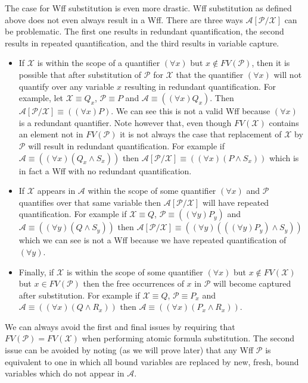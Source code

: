 \documentclass[12pt]{article}
\theoremstyle{break}
\theoremstyle{break}
\theoremstyle{break}
\theoremstyle{break}
\newcommand{\mc}[1]{\mathcal{#1}}
\begin{document}
The case for Wff substitution is even more drastic.
Wff substitution as defined above does not even always result in a Wff.
There are three ways $\mc{A}[\mc{P}/\mc{X}]$ can be problematic.
The first one results in redundant quantification, the second results in repeated quantification, and the third results in variable capture.

\begin{itemize}
\item{If $\mc{X}$ is within the scope of a quantifier $(\forall x)$ but $x\not \in FV(\mc{P})$, then it is possible that after substitution of $\mc{P}$ for $\mc{X}$ that the quantifier $(\forall x)$ will not quantify over any variable $x$ resulting in redundant quantification. For example, let $\mc{X} \equiv Q_x$, $\mc{P} \equiv P$ and $\mc{A} \equiv ((\forall x) Q_x)$. Then $\mc{A}[\mc{P}/\mc{X}] \equiv ((\forall x) P)$. We can see this is not a valid Wff because $(\forall x)$ is a redundant quantifier. Note however that, even though $FV(\mc{X})$ contains an element not in $FV(\mc{P})$ it is not always the case that replacement of $\mc{X}$ by $\mc{P}$ will result in redundant quantification. For example if $\mc{A} \equiv ((\forall x)(Q_x \land S_x))$ then $\mc{A}[\mc{P}/\mc{X}] \equiv ((\forall x)(P\land S_x))$ which is in fact a Wff with no redundant quantification.}
\item{If $\mc{X}$ appears in $\mc{A}$ within the scope of some quantifier $(\forall x)$ and $\mc{P}$ quantifies over that same variable then $\mc{A}[\mc{P}/\mc{X}]$ will have repeated quantification. For example if $\mc{X} \equiv Q$, $\mc{P} \equiv ((\forall y) P_y)$ and $\mc{A} \equiv ((\forall y) (Q\land S_y))$ then $\mc{A}[\mc{P}/\mc{X}] \equiv ((\forall y)(((\forall y)P_y)\land S_y))$ which we can see is not a Wff because we have repeated quantification of $(\forall y)$.}
\item{Finally, if $\mc{X}$ is within the scope of some quantifier $(\forall x)$ but $x\not \in FV(\mc{X})$ but $x\in FV(\mc{P})$ then the free occurrences of $x$ in $\mc{P}$ will become captured after substitution. For example if $\mc{X} \equiv Q$, $\mc{P} \equiv P_x$ and $\mc{A} \equiv ((\forall x) (Q\land R_x))$ then $\mc{A} \equiv ((\forall x)(P_x\land R_x))$.}
\end{itemize}

We can always avoid the first and final issues by requiring that $FV(\mc{P}) = FV(\mc{X})$ when performing atomic formula substitution.
The second issue can be avoided by noting (as we will prove later) that any Wff $\mc{P}$ is equivalent to one in which all bound variables are replaced by new, fresh, bound variables which do not appear in $\mc{A}$.
\end{document}
